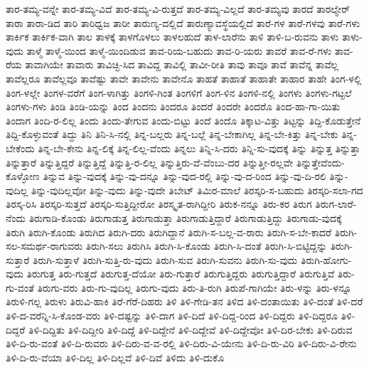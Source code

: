 {ತಾರ-ತಮ್ಯ-ವನ್ನೇ
ತಾರ-ತಮ್ಯ-ವಿದೆ
ತಾರ-ತಮ್ಯ-ವಿ-ರುತ್ತದೆ
ತಾರ-ತಮ್ಯ-ವಿಲ್ಲದೆ
ತಾರ-ತಮ್ಯವು
ತಾರದೆ
ತಾರಲ್ಯೇರ್
ತಾರಾ
ತಾರಾ-ಡಿದ
ತಾರಿ
ತಾರಿಧ್ವಜ
ತಾರೀ
ತಾರುಣ್ಯ-ದಲ್ಲಿದೆ
ತಾರುಣ್ಯಾವಸ್ಥೆಯಲ್ಲಿದೆ
ತಾರೆ-ಗಳ
ತಾರೆ-ಗಳವು
ತಾರೆ-ಗಳು
ತಾರ್ಕಿಕ
ತಾರ್ಕಿಕ-ವಾಗಿ
ತಾಲ
ತಾಳಕ್ಕೆ
ತಾಳಗೊಳಲು
ತಾಳಲಹುದೆ
ತಾಳ-ಲಾರೆನು
ತಾಳಿ
ತಾಳಿ-ಬ-ರುವನು
ತಾಳು
ತಾಳು-ವುದು
ತಾಳ್ಮೆ
ತಾಳ್ಮೆ-ಯಿಂದ
ತಾಳ್ಮೆ-ಯಿಂದಿಡುವ
ತಾವ-ರಿಯ-ಬಹುದು
ತಾವ-ರಿ-ಯರು
ತಾವರೆ
ತಾವ-ರೆ-ಗಳು
ತಾವ-ರೆಯ
ತಾವಾಗಿಯೇ
ತಾವಾರು
ತಾವಿಚ್ಛಿ-ಸಿದ
ತಾವಿದ್ದ
ತಾವಿಲ್ಲಿ
ತಾವೀ-ರೀತಿ
ತಾವು
ತಾವೂ
ತಾವೆ
ತಾವೆನ್ನ
ತಾವೆಲ್ಲ
ತಾವೆಲ್ಲರೂ
ತಾವೆಲ್ಲವೂ
ತಾವೆಷ್ಟು
ತಾವೇ
ತಾವೇನು
ತಾವೇನೊ
ತಾಹತೆ
ತಾಹಾತೆ
ತಾಹಾತೇ
ತಾಹಾರ
ತಾಹೇ
ತಿಂಗ-ಳಲ್ಲಿ
ತಿಂಗ-ಳಲ್ಲೇ
ತಿಂಗಳ-ವರೆಗೆ
ತಿಂಗ-ಳಾಗಿತ್ತು
ತಿಂಗಳಿ-ಗಿಂತ
ತಿಂಗಳಿಗೆ
ತಿಂಗ-ಳಿನ
ತಿಂಗಳಿ-ನಲ್ಲಿ
ತಿಂಗಳು
ತಿಂಗಳು-ಗಟ್ಟಲೆ
ತಿಂಗಳು-ಗಳು
ತಿಂಡಿ
ತಿಂಡಿ-ಯನ್ನು
ತಿಂದ
ತಿಂದನು
ತಿಂದರೂ
ತಿಂದರೆ
ತಿಂದರೇ
ತಿಂದರೊ
ತಿಂದ-ಹಾ-ಗಾ-ಯಿತು
ತಿಂದಾಗ
ತಿಂದಿ-ರ-ಲಿಲ್ಲ
ತಿಂದು
ತಿಂದು-ತೇಗುವ
ತಿಂದು-ಬಿಟ್ಟು
ತಿಂದೆ
ತಿಂದೊ
ತಿಕ್ಕಾಟ-ವಿತ್ತು
ತಿಟ್ಟನ್ನು
ತಿದ್ದಿ-ಕೊಡುತ್ತೇನೆ
ತಿದ್ದಿ-ಕೊಳ್ಳುವಂತೆ
ತಿದ್ದು
ತಿನಿ
ತಿನಿ-ಸಿ-ನಲ್ಲಿ
ತಿನ್ನ-ಬಲ್ಲರು
ತಿನ್ನ-ಬಲ್ಲೆ
ತಿನ್ನ-ಬೇಕಾಗಿಲ್ಲ
ತಿನ್ನ-ಬೇ-ಕಿತ್ತು
ತಿನ್ನ-ಬೇಕು
ತಿನ್ನ-ಬೇಕೆಂದು
ತಿನ್ನ-ಬೇ-ಕೇನು
ತಿನ್ನ-ಲಿಕ್ಕೆ
ತಿನ್ನ-ಲಿಲ್ಲ-ವೆಂದು
ತಿನ್ನಲು
ತಿನ್ನಿ-ಸಿ-ದರು
ತಿನ್ನಿ-ಸು-ವುದಕ್ಕೆ
ತಿನ್ನು
ತಿನ್ನುತ್ತ
ತಿನ್ನುತ್ತಾ
ತಿನ್ನುತ್ತಾರೆ
ತಿನ್ನುತ್ತಿದ್ದರೆ
ತಿನ್ನುತ್ತಿದ್ದೆ
ತಿನ್ನುತ್ತಿ-ರ-ಲಿಲ್ಲ
ತಿನ್ನುತ್ತಿರು-ವೆ-ವೆಂಬು-ದರ
ತಿನ್ನುತ್ತೀ-ರಲ್ಲವೇ
ತಿನ್ನುತ್ತೇವೆಂದು-ಕೊಳ್ಳೋಣ
ತಿನ್ನುವ
ತಿನ್ನು-ವುದಕ್ಕೆ
ತಿನ್ನು-ವು-ದನ್ನೂ
ತಿನ್ನು-ವುದ-ರಲ್ಲಿ
ತಿನ್ನು-ವು-ದ-ರಿಂದ
ತಿನ್ನು-ವು-ದಿ-ರಲಿ
ತಿನ್ನು-ವುದಿಲ್ಲ
ತಿನ್ನು-ವುದಿಲ್ಲವೋ
ತಿನ್ನು-ವುದು
ತಿನ್ನು-ವುದೇ
ತಿಬೇಟ್
ತಿಮಿರ-ಮಾಲೆ
ತಿರಸ್ಕರಿ-ಸ-ಬಹುದು
ತಿರಸ್ಕರಿ-ಸಲಾ-ಗದ
ತಿರಸ್ಕ-ರಿಸಿ
ತಿರಸ್ಕರಿ-ಸುತ್ತದೆ
ತಿರಸ್ಕರಿ-ಸುತ್ತಿದ್ದೀರೋ
ತಿರಸ್ಕೃತ-ರಾಗಿದ್ದೀರಿ
ತಿರುಕ-ನನ್ನೂ
ತಿರು-ಕರ
ತಿರುಗ
ತಿರುಗ-ಲಾರೆ-ನೆಂದು
ತಿರುಗಾಡಿ-ಕೊಂಡು
ತಿರುಗಾಡುತ್ತ
ತಿರುಗಾಡುತ್ತಾ
ತಿರುಗಾಡುತ್ತಿದ್ದಾರೆ
ತಿರುಗಾಡುತ್ತಿದ್ದು
ತಿರುಗಾಡು-ವುದಕ್ಕೆ
ತಿರುಗಿ
ತಿರುಗಿ-ಕೊಂಡು
ತಿರುಗಿದ
ತಿರುಗಿ-ದರು
ತಿರುಗಿದ್ದಾನೆ
ತಿರುಗಿ-ಸ-ಬಲ್ಲ-ವ-ರಾರು
ತಿರುಗಿ-ಸ-ಬೇ-ಕಾದರೆ
ತಿರುಗಿ-ಸಲ-ಸಮರ್ಥ-ರಾಗುವರು
ತಿರುಗಿ-ಸಲು
ತಿರುಗಿಸಿ
ತಿರುಗಿ-ಸಿ-ಕೊಂಡು
ತಿರುಗಿ-ಸಿ-ದಂತೆ
ತಿರುಗಿ-ಸಿ-ಬಿಟ್ಟಿದ್ದನ್ನು
ತಿರುಗಿ-ಸುತ್ತಾರೆ
ತಿರುಗಿ-ಸುತ್ತಾಳೆ
ತಿರುಗಿ-ಸುತ್ತಿ-ರು-ವುದು
ತಿರುಗಿ-ಸುವ
ತಿರುಗಿ-ಸುವನು
ತಿರುಗಿ-ಸು-ವುದು
ತಿರುಗಿ-ಹೋಗು-ವುದು
ತಿರುಗುತ್ತ
ತಿರು-ಗುತ್ತದೆ
ತಿರುಗುತ್ತ-ದೆಯೋ
ತಿರು-ಗುತ್ತಾರೆ
ತಿರುಗುತ್ತಿದ್ದರು
ತಿರುಗುತ್ತಿದ್ದಾರೆ
ತಿರುಗುತ್ತಿವೆ
ತಿರು-ಗು-ವಂತೆ
ತಿರುಗು-ವರು
ತಿರು-ಗು-ವುದಿಲ್ಲ
ತಿರುಗು-ವುದು
ತಿರು-ತಿ-ರುಗಿ
ತಿರುಪೆ-ಗಾಗಿಯೇ
ತಿರು-ಳನ್ನು
ತಿರು-ಳನ್ನೂ
ತಿರುಳಿ-ಗಲ್ಲ
ತಿರುಳು
ತಿರುವಿ-ಹಾಕಿ
ತಿರೆ-ಗೆರೆ-ದಿಹರು
ತಿಳಿ
ತಿಳಿ-ಗೇಡಿ-ತನ
ತಿಳಿದ
ತಿಳಿ-ದಂತಾಯಿತು
ತಿಳಿ-ದಂತೆ
ತಿಳಿ-ದರೆ
ತಿಳಿ-ದ-ವರೆನ್ನಿ-ಸಿ-ಕೊಂಡ-ವರು
ತಿಳಿ-ದಷ್ಟನ್ನು
ತಿಳಿ-ದಾಗ
ತಿಳಿ-ದಿದೆ
ತಿಳಿ-ದಿದ್ದ-ರಿಂದ
ತಿಳಿ-ದಿದ್ದರು
ತಿಳಿ-ದಿದ್ದರೂ
ತಿಳಿ-ದಿದ್ದರೆ
ತಿಳಿ-ದಿದ್ದಿತು
ತಿಳಿ-ದಿದ್ದೀರಿ
ತಿಳಿ-ದಿದ್ದೆ
ತಿಳಿ-ದಿದ್ದೇನೆ
ತಿಳಿ-ದಿದ್ದೇವೆ
ತಿಳಿ-ದಿದ್ದೇವೋ
ತಿಳಿ-ದಿರ-ಬೇಕು
ತಿಳಿ-ದಿರುವ
ತಿಳಿ-ದಿ-ರು-ವಂತೆ
ತಿಳಿ-ದಿ-ರುವರು
ತಿಳಿ-ದಿರು-ವ-ವ-ರಲ್ಲಿ
ತಿಳಿ-ದಿರು-ವಿ-ಯೇನು
ತಿಳಿ-ದಿ-ರು-ವಿರಿ
ತಿಳಿ-ದಿರು-ವಿ-ರೇನು
ತಿಳಿ-ದಿ-ರು-ವೆಯಾ
ತಿಳಿ-ದಿಲ್ಲ
ತಿಳಿ-ದಿಲ್ಲವೆ
ತಿಳಿ-ದಿವೆ
ತಿಳಿದು
ತಿಳಿ-ದುಕೊ
}

